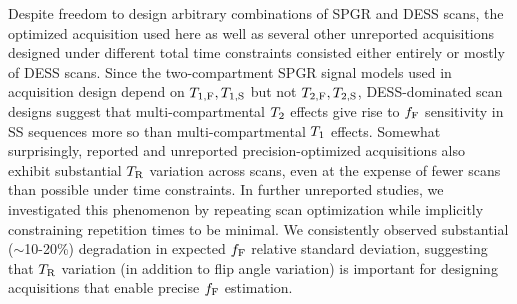 Despite freedom to design arbitrary combinations
of SPGR and DESS scans,
the optimized acquisition used here
as well as several other unreported acquisitions 
designed under different total time constraints
consisted either entirely or mostly of DESS scans.
Since the two-compartment SPGR signal models 
used in acquisition design
depend on $T_{1,\mathrm{F}},T_{1,\mathrm{S}}$ but not $T_{2,\mathrm{F}},T_{2,\mathrm{S}}$,
DESS-dominated scan designs suggest 
that multi-compartmental $T_2$ effects
give rise to $f_{\mathrm{F}}$ sensitivity in SS sequences
more so than multi-compartmental $T_1$ effects.
Somewhat surprisingly,
reported and unreported precision-optimized acquisitions 
also exhibit substantial $T_\mathrm{R}$ variation across scans,
even at the expense
of fewer scans than possible 
under time constraints.
In further unreported studies,
we investigated this phenomenon 
by repeating scan optimization
while implicitly constraining repetition times to be minimal.
We consistently observed substantial ($\sim$10-20\%) degradation
in expected $f_{\mathrm{F}}$ relative standard deviation,
suggesting that $T_\mathrm{R}$ variation 
(in addition to flip angle variation)
is important for designing acquisitions
that enable precise $f_{\mathrm{F}}$ estimation.

%

